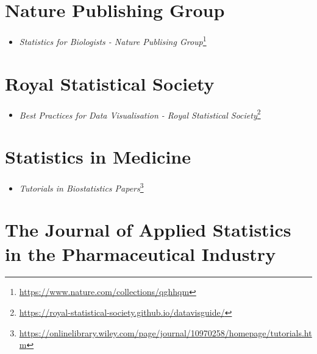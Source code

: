 \documentclass[
  a4paper,
]{book}
\providecommand{\tightlist}{%
  \setlength{\itemsep}{0pt}\setlength{\parskip}{0pt}}
\renewcommand{\href}[2]{#2\footnote{\url{#1}}}
\begin{document}
\hypertarget{nature-publishing-group}{%
\section*{Nature Publishing Group}\label{nature-publishing-group}}

\begin{itemize}
\tightlist
\item
  \href{https://www.nature.com/collections/qghhqm}{\emph{Statistics for Biologists - Nature Publising Group}}
\end{itemize}

\hypertarget{royal-statistical-society}{%
\section*{Royal Statistical Society}\label{royal-statistical-society}}

\begin{itemize}
\tightlist
\item
  \href{https://royal-statistical-society.github.io/datavisguide/}{\emph{Best Practices for Data Visualisation - Royal Statistical Society}}
\end{itemize}

\hypertarget{statistics-in-medicine}{%
\section*{Statistics in Medicine}\label{statistics-in-medicine}}

\begin{itemize}
\tightlist
\item
  \href{https://onlinelibrary.wiley.com/page/journal/10970258/homepage/tutorials.htm}{\emph{Tutorials in Biostatistics Papers}}
\end{itemize}

\hypertarget{the-journal-of-applied-statistics-in-the-pharmaceutical-industry}{%
\section*{The Journal of Applied Statistics in the Pharmaceutical Industry}\label{the-journal-of-applied-statistics-in-the-pharmaceutical-industry}}
\end{document}
